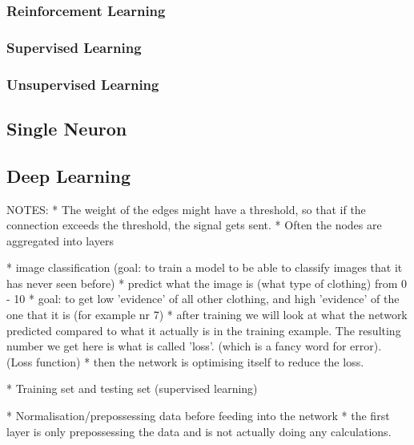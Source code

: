 \documentclass[
a4paper,
11pt,
english
]{report}
\begin{document}
\subsubsection{Reinforcement Learning}
\subsubsection{Supervised Learning}
\subsubsection{Unsupervised Learning}

\subsection{Single Neuron}
\subsection{Deep Learning}


NOTES:
* The weight of the edges might have a threshold, so that if the connection exceeds the threshold, the signal gets sent.
* Often the nodes are aggregated into layers

* image classification (goal: to train a model to be able to classify images that it has never seen before)
	* predict what the image is (what type of clothing) from 0 - 10
	* goal: to get low 'evidence' of all other clothing, and high 'evidence' of the one that it is (for example nr 7)
	* after training we will look at what the network predicted compared to what it actually is in the training example. The resulting number we get here is what is called 'loss'. (which is a fancy word for error). (Loss function)
	* then the network is optimising itself to reduce the loss.

* Training set and testing set (supervised learning)

* Normalisation/prepossessing data before feeding into the network
* the first layer is only prepossessing the data and is not actually doing any calculations.
\end{document}

